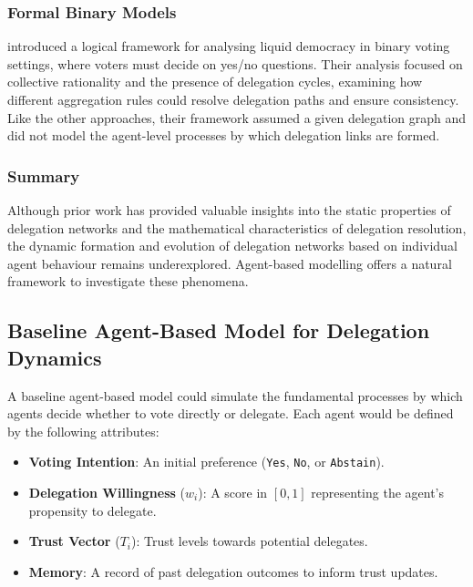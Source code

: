 \subsubsection{Formal Binary Models}

\citet{christoffBinaryVotingDelegable2017} introduced a logical framework for analysing liquid democracy in binary voting settings, where voters must decide on yes/no questions. Their analysis focused on collective rationality and the presence of delegation cycles, examining how different aggregation rules could resolve delegation paths and ensure consistency. Like the other approaches, their framework assumed a given delegation graph and did not model the agent-level processes by which delegation links are formed.

\subsubsection{Summary}

Although prior work has provided valuable insights into the static properties of delegation networks and the mathematical characteristics of delegation resolution, the dynamic formation and evolution of delegation networks based on individual agent behaviour remains underexplored. Agent-based modelling offers a natural framework to investigate these phenomena.

\subsection{Baseline Agent-Based Model for Delegation Dynamics}

A baseline agent-based model could simulate the fundamental processes by which agents decide whether to vote directly or delegate. Each agent would be defined by the following attributes:

\begin{itemize}
    \item \textbf{Voting Intention}: An initial preference (\texttt{Yes}, \texttt{No}, or \texttt{Abstain}).
    \item \textbf{Delegation Willingness} ($w_i$): A score in $[0,1]$ representing the agent's propensity to delegate.
    \item \textbf{Trust Vector} ($T_i$): Trust levels towards potential delegates.
    \item \textbf{Memory}: A record of past delegation outcomes to inform trust updates.
\end{itemize}

